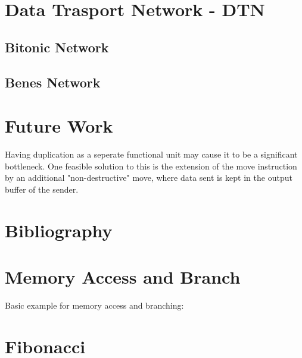 \documentclass[adraft]{eptcs}
\begin{document}
	\section{Data Trasport Network - DTN}
		

		\subsection{Bitonic Network}
			
			
		\FloatBarrier
		\subsection{Benes Network}
			

	\section{Future Work}
		Having duplication as a seperate functional unit may cause it to be a significant bottleneck.
		One feasible solution to this is the extension of the move instruction by an additional "non-destructive" move, where data sent is kept in the output buffer of the sender.
		

	\newpage
	\section{Bibliography}
		
		
	\newpage
	
	\begin{appendices}
		\newpage
		\section{Memory Access and Branch}
			\label{app:simple}
			Basic example for memory access and branching:
			
		
		\newpage
		\section{Fibonacci}
			\label{app:fib}
			
	\end{appendices}
	
\end{document}
